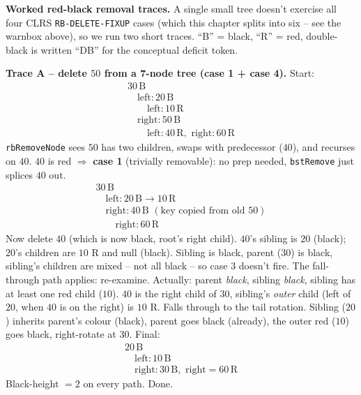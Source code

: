 \documentclass[11pt]{article}
\begin{document}
\begin{examplebox}
\textbf{Worked red-black removal traces.} A single small tree
doesn't exercise all four CLRS \texttt{RB-DELETE-FIXUP} cases (which
this chapter splits into six -- see the warnbox above), so we run
two short traces. ``B'' = black, ``R'' = red, double-black is
written ``DB'' for the conceptual deficit token.

\textbf{Trace A -- delete $50$ from a 7-node tree (case 1 + case 4).}
Start:
\[
\begin{array}{l}
30\,\text{B} \\
\quad \text{left}: 20\,\text{B} \\
\qquad \text{left}: 10\,\text{R} \\
\quad \text{right}: 50\,\text{B} \\
\qquad \text{left}: 40\,\text{R},\,\, \text{right}: 60\,\text{R}
\end{array}
\]
\texttt{rbRemoveNode} sees $50$ has two children, swaps with
predecessor ($40$), and recurses on $40$. $40$ is red $\Rightarrow$
\textbf{case 1} (trivially removable): no prep needed,
\texttt{bstRemove} just splices $40$ out.
\[
\begin{array}{l}
30\,\text{B} \\
\quad \text{left}: 20\,\text{B} \to 10\,\text{R} \\
\quad \text{right}: 40\,\text{B}\,\, (\text{key copied from old } 50) \\
\qquad \text{right}: 60\,\text{R}
\end{array}
\]
Now delete $40$ (which is now black, root's right child).
$40$'s sibling is $20$ (black); $20$'s children are $10$ R and
null (black). Sibling is black, parent ($30$) is black, sibling's
children are mixed -- not all black -- so case 3 doesn't fire.
The fall-through path applies: re-examine. Actually: parent
\emph{black}, sibling \emph{black}, sibling has at least one red
child ($10$). $40$ is the right child of $30$, sibling's
\emph{outer} child (left of $20$, when $40$ is on the right) is
$10$ R. Falls through to the tail rotation. Sibling ($20$)
inherits parent's colour (black), parent goes black (already),
the outer red ($10$) goes black, right-rotate at $30$. Final:
\[
\begin{array}{l}
20\,\text{B} \\
\quad \text{left}: 10\,\text{B} \\
\quad \text{right}: 30\,\text{B},\,\, \text{right} = 60\,\text{R}
\end{array}
\]
Black-height $= 2$ on every path. Done.


\end{examplebox}
\end{document}
